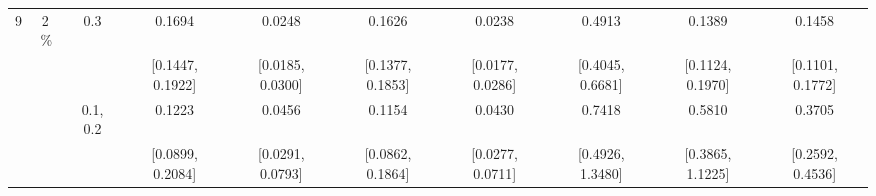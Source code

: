 \begin{tabular}{@{}cccccccccc@{}}
\midrule
9 & 2\,\% & 0.3 & 0.1694 & 0.0248 & 0.1626 & 0.0238 & 0.4913 & 0.1389 & 0.1458 \\
 &  &  & {\tiny[0.1447, 0.1922]} & {\tiny[0.0185, 0.0300]} & {\tiny[0.1377, 0.1853]} & {\tiny[0.0177, 0.0286]} & {\tiny[0.4045, 0.6681]} & {\tiny[0.1124, 0.1970]} & {\tiny[0.1101, 0.1772]} \\[2pt]
 &  & 0.1, 0.2 & 0.1223 & 0.0456 & 0.1154 & 0.0430 & 0.7418 & 0.5810 & 0.3705 \\
 &  &  & {\tiny[0.0899, 0.2084]} & {\tiny[0.0291, 0.0793]} & {\tiny[0.0862, 0.1864]} & {\tiny[0.0277, 0.0711]} & {\tiny[0.4926, 1.3480]} & {\tiny[0.3865, 1.1225]} & {\tiny[0.2592, 0.4536]} \\
\bottomrule
\end{tabular}
